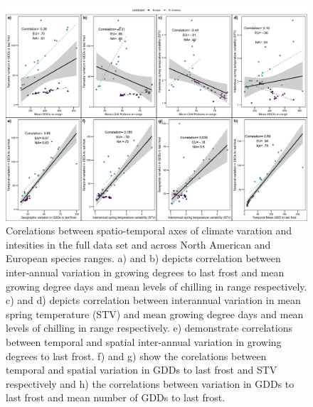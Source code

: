 \documentclass[12pt]{article}\usepackage[]{graphicx}\usepackage[]{color}
\begin{document}
\begin{figure}[h!]
    \centering
 \includegraphics[width=\textwidth]{..//..//analyses/ranges/figures/clim_params.jpeg} 
    \caption{Corelations between spatio-temporal axes of climate varation and intesities in the full data set and across North American and European species ranges. a)  and b) depicts correlation between inter-annual variation in growing degrees to last frost and mean growing degree days and mean levels of chilling in range respectively.  c)  and d) depicts correlation between interannual variation in mean spring temperature (STV) and mean growing degree days and mean levels of chilling in range respectively. e) demonstrate correlations between temporal and spatial inter-annual variation in growing degrees to last frost. f) and g) show the corelations between temporal and spatial variation in GDDs to last frost and STV respectively and h) the correlations between variation in GDDs to last frost and mean number of GDDs to last frost. }
    \label{fig:corrs}
\end{figure}
\end{document}
